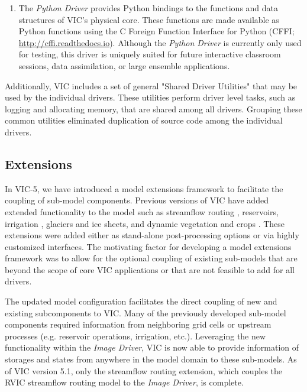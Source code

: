 \documentclass[gmd, manuscript]{copernicus}
\begin{document}
\begin{enumerate}
      \item The \textit{Python Driver} provides Python bindings to the functions and data structures of VIC’s physical core. These functions are made available as Python functions using the C Foreign Function Interface for Python (CFFI; \url{http://cffi.readthedocs.io}). Although the \textit{Python Driver} is currently only used for testing, this driver is uniquely suited for future interactive classroom sessions, data assimilation, or large ensemble applications.
    \end{enumerate}

    Additionally, VIC includes a set of general "Shared Driver Utilities" that may be used by the individual drivers. These utilities perform driver level tasks, such as logging and allocating memory, that are shared among all drivers. Grouping these common utilities eliminated duplication of source code among the individual drivers.

    \subsection{Extensions}
      \label{sec:extensions}
      In VIC-5, we have introduced a model extensions framework to facilitate the coupling of sub-model components. Previous versions of VIC have added extended functionality to the model such as streamflow routing \citep{Lohmann_1996, Hamman_2017a}, reservoirs, irrigation \citep{Haddeland_2006}, glaciers and ice sheets, and dynamic vegetation and crops \citep{Adam_2015}. These extensions were added either as stand-alone post-processing options or via highly customized interfaces. The motivating factor for developing a model extensions framework was to allow for the optional coupling of existing sub-models that are beyond the scope of core VIC applications or that are not feasible to add for all drivers.

      The updated model configuration facilitates the direct coupling of new and existing subcomponents to VIC. Many of the previously developed sub-model components required information from neighboring grid cells or upstream processes (e.g. reservoir operations, irrigation, etc.). Leveraging the new functionality within the \textit{Image Driver}, VIC is now able to provide information of storages and states from anywhere in the model domain to these sub-models. As of VIC version 5.1, only the streamflow routing extension, which couples the RVIC streamflow routing model \citep{Hamman_2017a} to the \textit{Image Driver}, is complete.
\end{document}
